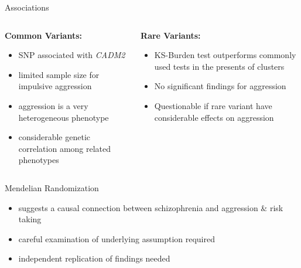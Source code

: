 \documentclass{beamer}
\begin{document}
\begin{frame}[t]{Associations}
  \small
  \begin{columns}[T]
    \begin{column}[T]{0.5\textwidth}
     \textbf{Common Variants:}
     \begin{itemize}
       \item SNP associated with \textit{CADM2}
       \item limited sample size for impulsive aggression
       \item aggression is a very heterogeneous phenotype
       \item considerable genetic correlation among related phenotypes 
     \end{itemize}
   \end{column}
   \begin{column}[T]{0.5\textwidth}
     \textbf{Rare Variants:}
     \begin{itemize}
       \item KS-Burden test outperforms commonly used tests in the presents of clusters
       \item No significant findings for aggression
       \item Questionable if rare variant have considerable effects on aggression
     \end{itemize}
   \end{column}
 \end{columns} 
\end{frame}

\begin{frame}[t]{Mendelian Randomization}
  \begin{itemize}
    \item suggests a causal connection between schizophrenia and aggression \& risk taking
    \item careful examination of underlying assumption required
    \item independent replication of findings needed
  \end{itemize}
\end{frame}


\end{document}
